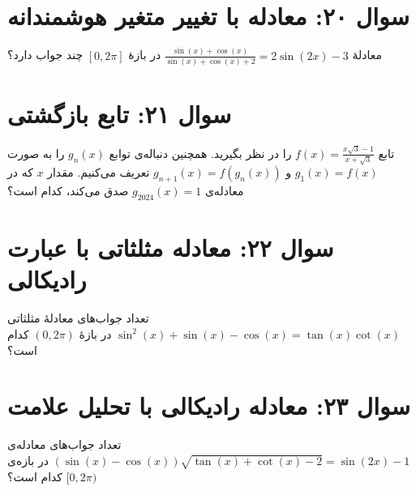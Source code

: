 \documentclass[12pt]{article}
\begin{document}
	
	\vspace{1cm}
	\hrulefill
	\vspace{1cm}
	\section*{سوال ۲۰: معادله با تغییر متغیر هوشمندانه}
	معادلهٔ \( \frac{\sin(x)+\cos(x)}{\sin(x)+\cos(x)+2} = 2\sin(2x)-3 \) در بازهٔ \( [0, 2\pi] \) چند جواب دارد؟
	
	
	\vspace{1cm}
	\hrulefill
	\vspace{1cm}
	\section*{سوال ۲۱: تابع بازگشتی}
	تابع \( f(x) = \frac{x\sqrt{3} - 1}{x + \sqrt{3}} \) را در نظر بگیرید. همچنین دنباله‌ی توابع \( g_n(x) \) را به صورت \( g_1(x) = f(x) \) و \( g_{n+1}(x) = f(g_n(x)) \) تعریف می‌کنیم. مقدار \(x\) که در معادله‌ی \( g_{2024}(x) = 1 \) صدق می‌کند، کدام است؟


	\vspace{1cm}
	\hrulefill
	\vspace{1cm}
	\section*{سوال ۲۲: معادله مثلثاتی با عبارت رادیکالی}
	
	تعداد جواب‌های معادلهٔ مثلثاتی \( \sin^2(x) + \sin(x) - \cos(x) = \tan(x)\cot(x) \) در بازهٔ \( (0, 2\pi) \) کدام است؟
	
	
	\vspace{1cm}
	\hrulefill
	\vspace{1cm}
	\section*{سوال ۲۳: معادله رادیکالی با تحلیل علامت}
	تعداد جواب‌های معادله‌ی \( (\sin(x) - \cos(x)) \sqrt{\tan(x) + \cot(x) - 2} = \sin(2x) - 1 \) در بازه‌ی \( [0, 2\pi) \) کدام است؟
	
\end{document}
